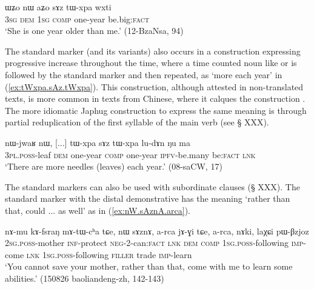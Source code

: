 \begin{exe}
\ex \label{ex:aZo.YWwxti}
\gll ɯʑo nɯ aʑo sɤz tɯ-xpa wxti  \\
\textsc{3sg} \textsc{dem} \textsc{1sg} \textsc{comp} one-year be.big:\textsc{fact} \\
\glt `She is one year older than me.' (12-BzaNsa, 94)
\end{exe}

The standard marker  (and its variants) also occurs in a  construction expressing progressive increase throughout the time, where a time counted noun like  or  is followed by the standard marker and then repeated, as  `more each year' in (\ref{ex:tWxpa.sAz.tWxpa}). This construction, although attested in non-translated texts, is more common in texts from Chinese, where it calques the construction . The more idiomatic Japhug construction to express the same meaning is through partial reduplication of the first syllable of the main verb (see § XXX).
 
 \begin{exe}
 \ex \label{ex:tWxpa.sAz.tWxpa}
 \gll nɯ-jwaʁ nɯ, [...] tɯ-xpa sɤz tɯ-xpa lu-dɤn ŋu ma \\
 \textsc{3pl}.\textsc{poss}-leaf \textsc{dem} { } one-year \textsc{comp} one-year \textsc{ipfv}-be.many be:\textsc{fact} \textsc{lnk} \\
\glt  `There are more needles (leaves) each year.' (08-saCW, 17)
\end{exe}
 
 The standard markers can also be used with subordinate clauses (§ XXX). The standard marker with the distal demonstrative  has the meaning `rather than that, could ... as well' as in (\ref{ex:nW.sAznA.arca}).  
 
 \begin{exe}
 \ex \label{ex:nW.sAznA.arca}
 \gll  nɤ-mu kɤ-fsraŋ mɤ-tɯ-cʰa tɕe, nɯ sɤznɤ, a-rca jɤ-ɣi tɕe, a-rca, nɤki, laχɕi pɯ-βzjoz \\
 \textsc{2sg}.\textsc{poss}-mother \textsc{inf}-protect \textsc{neg}-2-can:\textsc{fact} \textsc{lnk} \textsc{dem} \textsc{comp} \textsc{1sg}.\textsc{poss}-following \textsc{imp}-come \textsc{lnk} \textsc{1sg}.\textsc{poss}-following \textsc{filler} trade \textsc{imp}-learn \\
\glt `You cannot save your mother, rather than that, come with me to learn  some abilities.' (150826 baoliandeng-zh, 142-143)
\end{exe}

